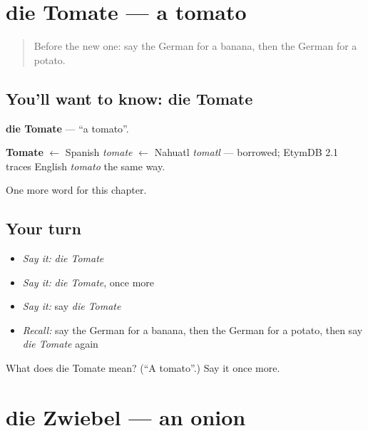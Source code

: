 \section[die Tomate]{die Tomate — a tomato}

\label{lesson:GE-C70-tomate}



\begin{quote}
Before the new one: say the German for a banana, then the German for a potato.
\end{quote}

\subsection*{You'll want to know: die Tomate}
\textbf{die Tomate} — \textquotedblleft{}a tomato\textquotedblright{}.

\begin{cousinweb}
\textbf{Tomate} $\leftarrow$ Spanish \emph{tomate} $\leftarrow$ Nahuatl \emph{tomatl} — borrowed; EtymDB 2.1 traces English \emph{tomato} the same way.
\end{cousinweb}

\begin{grammarlens}[title={What you've built}]
One more word for this chapter.
\end{grammarlens}

\subsection*{Your turn}
\begin{itemize}
\raggedright
  \item \emph{Say it:} \emph{die Tomate}
  \item \emph{Say it:} \emph{die Tomate}, once more
  \item \emph{Say it:} say \emph{die Tomate}
  \item \emph{Recall:} say the German for a banana, then the German for a potato, then say \emph{die Tomate} again
\end{itemize}

\begin{tcolorbox}[breakable,colback=teal!4,colframe=teal!35!black,title={Before you move on}]
What does die Tomate mean? (\textquotedblleft{}A tomato\textquotedblright{}.) Say it once more.
\end{tcolorbox}
\section[die Zwiebel]{die Zwiebel — an onion}

